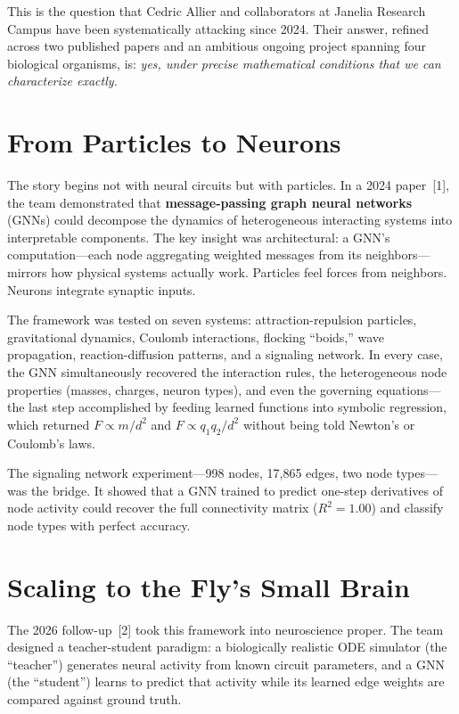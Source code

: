 \documentclass[11pt,twocolumn]{article}
\begin{document}
This is the question that Cedric Allier and collaborators at Janelia Research Campus have been systematically attacking since 2024. Their answer, refined across two published papers and an ambitious ongoing project spanning four biological organisms, is: \emph{yes, under precise mathematical conditions that we can characterize exactly.}

\section{From Particles to Neurons}

The story begins not with neural circuits but with particles. In a 2024 paper~[1], the team demonstrated that \textbf{message-passing graph neural networks} (GNNs) could decompose the dynamics of heterogeneous interacting systems into interpretable components. The key insight was architectural: a GNN's computation---each node aggregating weighted messages from its neighbors---mirrors how physical systems actually work. Particles feel forces from neighbors. Neurons integrate synaptic inputs.

The framework was tested on seven systems: attraction-repulsion particles, gravitational dynamics, Coulomb interactions, flocking ``boids,'' wave propagation, reaction-diffusion patterns, and a signaling network. In every case, the GNN simultaneously recovered the interaction rules, the heterogeneous node properties (masses, charges, neuron types), and even the governing equations---the last step accomplished by feeding learned functions into symbolic regression, which returned $F \propto m/d^2$ and $F \propto q_1 q_2 / d^2$ without being told Newton's or Coulomb's laws.

The signaling network experiment---998 nodes, 17,865 edges, two node types---was the bridge. It showed that a GNN trained to predict one-step derivatives of node activity could recover the full connectivity matrix ($R^2 = 1.00$) and classify node types with perfect accuracy.

\section{Scaling to the Fly's Small Brain}

The 2026 follow-up~[2] took this framework into neuroscience proper. The team designed a teacher-student paradigm: a biologically realistic ODE simulator (the ``teacher'') generates neural activity from known circuit parameters, and a GNN (the ``student'') learns to predict that activity while its learned edge weights are compared against ground truth.
\end{document}
